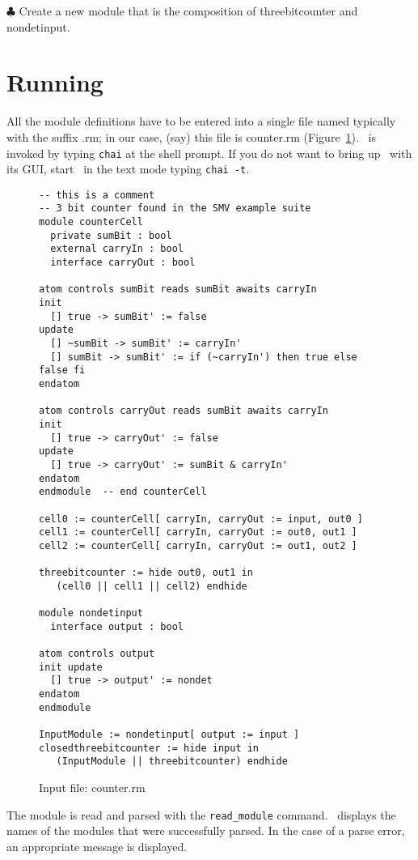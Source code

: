 \noindent
$\clubsuit$ Create a new
module that is the composition of threebitcounter and nondetinput. 

\section{Running \chai}
All the module definitions have to be entered into a single file named
typically with the suffix .rm; in our case, (say) this file is
counter.rm (Figure~\ref{fig:finalfile}). \chai\ is invoked by typing {\tt chai} at the shell
prompt. If you do not want to bring up \chai\ with its GUI, start
\chai\ in the text mode typing {\tt chai -t}.

\begin{figure}
\begin{verbatim}
-- this is a comment
-- 3 bit counter found in the SMV example suite 
module counterCell
  private sumBit : bool
  external carryIn : bool
  interface carryOut : bool

atom controls sumBit reads sumBit awaits carryIn 
init
  [] true -> sumBit' := false
update
  [] ~sumBit -> sumBit' := carryIn'
  [] sumBit -> sumBit' := if (~carryIn') then true else false fi
endatom

atom controls carryOut reads sumBit awaits carryIn
init
  [] true -> carryOut' := false
update
  [] true -> carryOut' := sumBit & carryIn'
endatom
endmodule  -- end counterCell

cell0 := counterCell[ carryIn, carryOut := input, out0 ]
cell1 := counterCell[ carryIn, carryOut := out0, out1 ]
cell2 := counterCell[ carryIn, carryOut := out1, out2 ]

threebitcounter := hide out0, out1 in
   (cell0 || cell1 || cell2) endhide

module nondetinput
  interface output : bool

atom controls output
init update
  [] true -> output' := nondet
endatom 
endmodule 

InputModule := nondetinput[ output := input ]
closedthreebitcounter := hide input in
   (InputModule || threebitcounter) endhide
\end{verbatim}
\caption{Input file: counter.rm}
\label{fig:finalfile}
\end{figure}

The module  is read and parsed with the {\tt read\_module} command.
\chai\ displays the names of the modules that were successfully
parsed. In the case of a parse error, an appropriate message is
displayed. 

